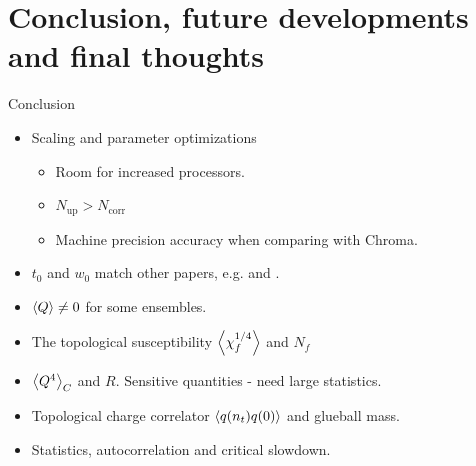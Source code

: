 \documentclass[10pt,show notes on second screen]{beamer}
\begin{document}
\section{Conclusion, future developments and final thoughts}
\begin{frame}{Conclusion}
\begin{itemize}
    \item <1->Scaling and parameter optimizations %
    \begin{itemize}
        \item <2->Room for increased processors.
        \item <3->$N_\mathrm{up} > N_\mathrm{corr}$
        \item <4->Machine precision accuracy when comparing with Chroma.
    \end{itemize}
    \item <5->$t_0$ and $w_0$ match other papers, e.g. \citet{luscher_properties_2010} and \citet{ce_non-gaussianities_2015}.%
    \item <6->$\left\langle{Q}\right\rangle \neq 0$ for some ensembles. %
    \item <7->The topological susceptibility $\left\langle{\chi^{1/4}_f}\right\rangle$ and $N_f$ %
    \item <8->$\left\langle{Q^4}\right\rangle_C$ and $R$. Sensitive quantities - need large statistics.%
    \item <9->Topological charge correlator $\left\langle{q(n_t)q(0)}\right\rangle$ and glueball mass. %
    \item <10->Statistics, autocorrelation and critical slowdown.%
\end{itemize}
\end{frame}
\end{document}
